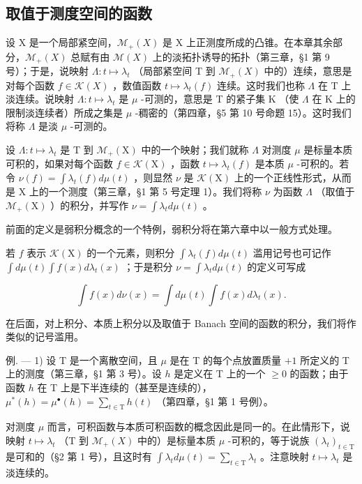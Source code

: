 \subsection{取值于测度空间的函数}

设 X 是一个局部紧空间，\(\mathcal{M}_{+}(X)\) 是 X 上正测度所成的凸锥。在本章其余部分，\(\mathcal{M}_{+}(X)\) 总赋有由 \(\mathcal{M}(X)\) 上的淡拓扑诱导的拓扑（第三章，§1 第 9 号）；于是，说映射 \(\Lambda: t \mapsto \lambda_{t}\) （局部紧空间 T 到 \(\mathcal{M}_{+}(X)\) 中的）连续，意思是对每个函数 \(f \in \mathcal{K}(X)\) ，数值函数 \(t \mapsto \lambda_{t}(f)\) 连续。这时我们也称 \(\Lambda\) 在 T 上淡连续。说映射 \(\Lambda: t \mapsto \lambda_{t}\) 是 \(\mu\) -可测的，意思是 T 的紧子集 K （使 \(\Lambda\) 在 K 上的限制淡连续者）所成之集是 \(\mu\) -稠密的（第四章，§5 第 10 号命题 15）。这时我们将称 \(\Lambda\) 是淡 \(\mu\) -可测的。

设 \(\Lambda : t \mapsto \lambda_t\) 是 T 到 \(\mathcal{M}_+(\mathrm{X})\) 中的一个映射；我们就称 \(\Lambda\) 对测度 \(\mu\) 是标量本质可积的，如果对每个函数 \(f \in \mathcal{K}(\mathrm{X})\) ，函数 \(t \mapsto \lambda_t(f)\) 是本质 \(\mu\) -可积的。若令 \(\nu(f) = \int \lambda_t(f) d\mu(t)\) ，则显然 \(\nu\) 是 \(\mathcal{K}(\mathrm{X})\) 上的一个正线性形式，从而是 X 上的一个测度（第三章，§1 第 5 号定理 1）。我们将称 \(\nu\) 为函数 \(\Lambda\) （取值于 \(\mathcal{M}_+(\mathrm{X})\) ）的积分，并写作 \(\nu = \int \lambda_t d\mu(t)\) 。

前面的定义是弱积分概念的一个特例，弱积分将在第六章中以一般方式处理。

若 \(f\) 表示 \(\mathcal{K}(\mathrm{X})\) 的一个元素，则积分 \(\int \lambda_t(f) d\mu(t)\) 滥用记号也可记作 \(\int d\mu(t) \int f(x) d\lambda_t(x)\) ；于是积分 \(\nu = \int \lambda_t d\mu(t)\) 的定义可写成

\[
\int f (x) d \nu (x) = \int d \mu (t) \int f (x) d \lambda_ {t} (x).\tag{1}
\]

在后面，对上积分、本质上积分以及取值于 Banach 空间的函数的积分，我们将作类似的记号滥用。

例. --- 1) 设 T 是一个离散空间，且 \(\mu\) 是在 T 的每个点放置质量 \(+1\) 所定义的 T 上的测度（第三章，§1 第 3 号）。设 \(h\) 是定义在 T 上的一个 \(\geqslant 0\) 的函数；由于函数 \(h\) 在 T 上是下半连续的（甚至是连续的），\(\mu^{*}(h) = \mu^{\bullet}(h) = \sum_{t\in \mathrm{T}}h(t)\) （第四章，§1 第 1 号例）。

对测度 \(\mu\) 而言，可积函数与本质可积函数的概念因此是同一的。在此情形下，说映射 \(t \mapsto \lambda_t\) （T 到 \(\mathcal{M}_+(X)\) 中的）是标量本质 \(\mu\) -可积的，等于说族 \((\lambda_t)_{t \in \mathrm{T}}\) 是可和的（§2 第 1 号），且这时有 \(\int \lambda_t d\mu(t) = \sum_{t \in \mathrm{T}} \lambda_t\) 。注意映射 \(t \mapsto \lambda_t\) 是淡连续的。

